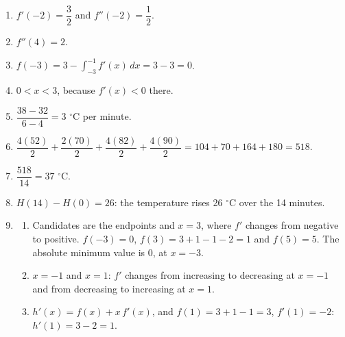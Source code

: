 \documentclass[11pt]{article}
\begin{document}
\newpage
\begin{solbox}
\begin{enumerate}[leftmargin=*,itemsep=4pt]
  \item $f'(-2)=\dfrac32$ and $f''(-2)=\dfrac12$.
  \item $f''(4)=2$.
  \item $f(-3)=3-\displaystyle\int_{-3}^{-1}f'(x)\,dx=3-3=0$.
  \item $0<x<3$, because $f'(x)<0$ there.
  \item $\dfrac{38-32}{6-4}=3$ $^\circ$C per minute.
  \item $\dfrac{4(52)}{2}+\dfrac{2(70)}{2}+\dfrac{4(82)}{2}+\dfrac{4(90)}{2}=104+70+164+180=518$.
  \item $\dfrac{518}{14}=37$ $^\circ$C.
  \item $H(14)-H(0)=26$: the temperature rises 26 $^\circ$C over the 14 minutes.
  \item \begin{enumerate}[label=(\alph*),leftmargin=*,itemsep=3pt]
    \item Candidates are the endpoints and $x=3$, where $f'$ changes from negative to positive. $f(-3)=0$, $f(3)=3+1-1-2=1$ and $f(5)=5$. The absolute minimum value is 0, at $x=-3$.
    \item $x=-1$ and $x=1$: $f'$ changes from increasing to decreasing at $x=-1$ and from decreasing to increasing at $x=1$.
    \item $h'(x)=f(x)+x\,f'(x)$, and $f(1)=3+1-1=3$, $f'(1)=-2$: $h'(1)=3-2=1$.
  \end{enumerate}
\end{enumerate}
\end{solbox}
\end{document}

